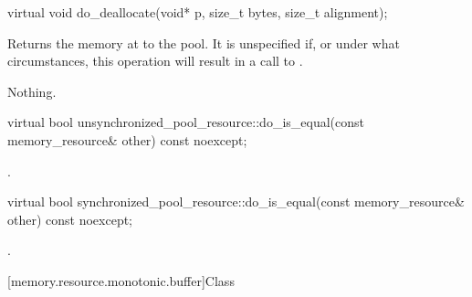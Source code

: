 %
%
%
%
\begin{itemdecl}
virtual void do_deallocate(void* p, size_t bytes, size_t alignment);
\end{itemdecl}

\begin{itemdescr}
\pnum
\effects
Returns the memory at  to the pool.
It is unspecified if, or under what circumstances,
this operation will result in a call to .

\pnum
\throws
Nothing.
\end{itemdescr}

%
%
\begin{itemdecl}
virtual bool unsynchronized_pool_resource::do_is_equal(const memory_resource& other) const noexcept;
\end{itemdecl}

\begin{itemdescr}
\pnum
\returns
{}.
\end{itemdescr}

%
%
\begin{itemdecl}
virtual bool synchronized_pool_resource::do_is_equal(const memory_resource& other) const noexcept;
\end{itemdecl}

\begin{itemdescr}
\pnum
\returns
{}.
\end{itemdescr}

[memory.resource.monotonic.buffer]{Class }

